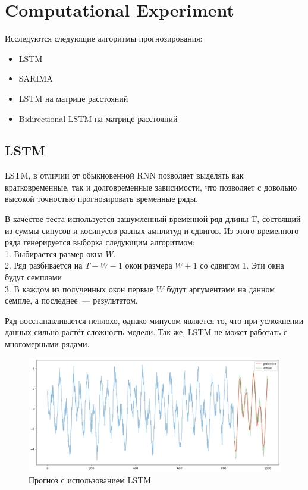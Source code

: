 \documentclass{article}
\begin{document}
\section{Computational Experiment}

Исследуются следующие алгоритмы прогнозирования:

\begin{itemize}
	\item LSTM \cite{LSTM}
	\item SARIMA \cite{ARIMAvsLSTM}
	\item LSTM на матрице расстояний
	\item Bidirectional LSTM на матрице расстояний
\end{itemize}

\subsection{LSTM}

LSTM, в отличии от обыкновенной RNN позволяет выделять как кратковременные, так и долговременные зависимости, что позволяет с довольно высокой точностью прогнозировать временные ряды.

В качестве теста используется зашумленный временной ряд длины T, состоящий из суммы синусов и косинусов разных амплитуд и сдвигов. Из этого временного ряда генерируется выборка следующим алгоритмом:\\
1. Выбирается размер окна $W$.\\
2. Ряд разбивается на $T-W-1$ окон размера $W+1$ со сдвигом 1. Эти окна будут семплами\\
3. В каждом из полученных окон первые $W$ будут аргументами на данном семпле, а последнее~--- результатом.

Ряд восстанавливается неплохо, однако минусом является то, что при усложнении данных сильно растёт сложность модели. Так же, LSTM не может работать с многомерными рядами.

\begin{figure}[H]
	\centering
	\includegraphics[width=\textwidth]{LSTM-prediction.png}
	\caption{Прогноз с использованием LSTM}
	\label{fig:fig6}
\end{figure}
\end{document}
